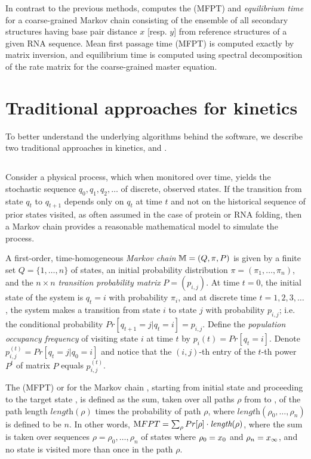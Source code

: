 In contrast to the previous methods, \hermes computes the \mfpt (MFPT)
and {\em equilibrium time} for a
coarse-grained Markov chain consisting of the ensemble of all
secondary structures having base pair distance $x$ [resp. $y$] from
reference structures  of a given RNA sequence.
Mean first passage time (MFPT) is computed exactly by matrix inversion,
and equilibrium time is computed using spectral decomposition of the rate
matrix for the coarse-grained master equation.

\section{Traditional approaches for kinetics}
\label{sec:hermes:kinetics}

To better understand the underlying algorithms behind the software,
we describe two traditional approaches in kinetics, \mfpt and \eqt.

\subsection{\Mfpt}
\label{subsec:hermes:mfpt}

Consider a physical process,
which when monitored over time, yields the stochastic sequence
$q_0,q_1,q_2,\dots$ of discrete, observed states. If the transition from
state $q_t$ to $q_{t+1}$ depends only on $q_t$ at time
$t$ and not on the historical sequence of prior states visited,
as often assumed in the case of protein or
RNA folding, then a Markov chain provides a reasonable
mathematical model to simulate the process.

A first-order, time-homogeneous
{\em Markov chain} $\mathbb{M} = (Q,\pi,P)$ is given by a finite
set $Q = \{ 1,\dots,n \}$ of states, an initial probability distribution
$\pi = (\pi_1,\dots,\pi_n)$, and the $n \times n$
{\em transition probability matrix} $P = (p_{i,j})$.
At time $t=0$, the initial state of the system is
$q_t=i$ with probability $\pi_i$, and at discrete time
$t=1,2,3,\dots$, the system makes a transition from state
$i$ to state $j$ with probability $p_{i,j}$; i.e.
the conditional probability $Pr[ q_{t+1} = j | q_t=i] = p_{i,j}$.
Define the {\em population occupancy frequency} of visiting state
$i$ at time $t$ by $p_{i}(t) = Pr[q_t=i]$.  Denote
$p_{i,j}^{(t)} = Pr[q_t = j | q_0 = i]$ and notice that
the $(i,j)$-th entry of the $t$-th power $P^t$ of matrix $P$  equals
$p_{i,j}^{(t)}$.

The {\em \mfpt} (MFPT) or
{\em \hit} for the Markov chain \mChain,
starting from initial state \xStart and proceeding
to the target state \xEnd, is defined
as the sum, taken over all paths $\rho$
from \xStart to \xEnd, of the path length $\textit{length}(\rho)$
times the probability
of path $\rho$, where $\textit{length}(\rho_0,\dots,\rho_n)$ is defined to
be $n$. In other words,
${\text MFPT} = \sum_{\rho} Pr[\rho] \cdot \textit{length}(\rho)$, where
the sum is taken over sequences $\rho=\rho_0,\dots,\rho_n$ of states
where $\rho_0=x_0$ and $\rho_n=x_\infty$, and no state is visited more
than once in the path $\rho$.

